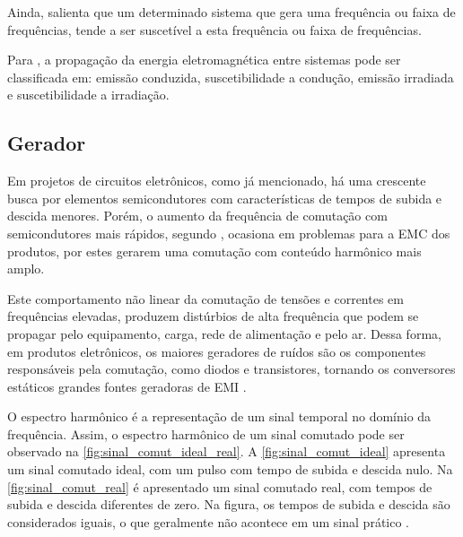     Ainda,  salienta que um determinado sistema que gera uma frequência ou faixa de frequências, tende a ser suscetível a esta frequência ou faixa de frequências.
    
    Para , a propagação da energia eletromagnética entre sistemas pode ser classificada em: emissão conduzida, suscetibilidade a condução, emissão irradiada e suscetibilidade a irradiação.
    
        \subsection{Gerador} \label{cap:fund_emc_gen}
        
        Em projetos de circuitos eletrônicos, como já mencionado, há uma crescente busca por elementos semicondutores com características de tempos de subida e descida menores. Porém, o aumento da frequência de comutação com semicondutores mais rápidos, segundo , ocasiona em problemas para a EMC dos produtos, por estes gerarem uma comutação com conteúdo harmônico mais amplo.
        
        Este comportamento não linear da comutação de tensões e correntes em frequências elevadas, produzem distúrbios de alta frequência que podem se propagar pelo equipamento, carga, rede de alimentação e pelo ar. Dessa forma, em produtos eletrônicos, os maiores geradores de ruídos são os componentes responsáveis pela comutação, como diodos e transistores, tornando os conversores estáticos grandes fontes geradoras de EMI \cite{ref:EMC_phd_schlichting}. 
        
        O espectro harmônico é a representação de um sinal temporal no domínio da frequência. Assim, o espectro harmônico de um sinal comutado pode ser observado na \autoref{fig:sinal_comut_ideal_real}. A \autoref{fig:sinal_comut_ideal} apresenta um sinal comutado ideal, com um pulso com tempo de subida e descida nulo. Na \autoref{fig:sinal_comut_real} é apresentado um sinal comutado real, com tempos de subida e descida diferentes de zero. Na figura, os tempos de subida e descida são considerados iguais, o que geralmente não acontece em um sinal prático \cite{ref:EMC_phd_schlichting}.
        
